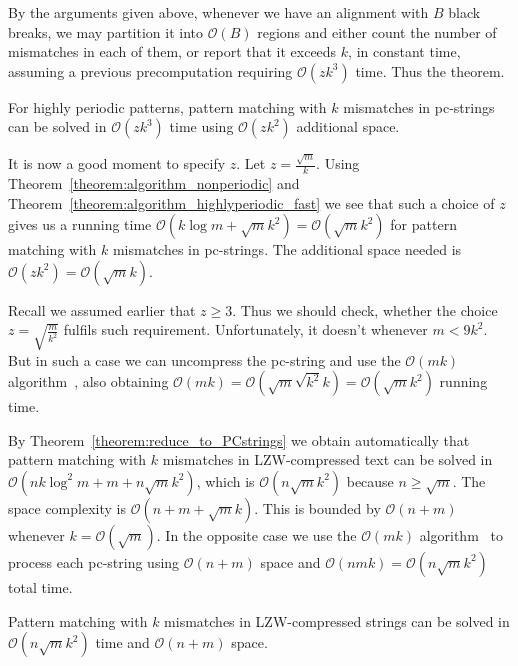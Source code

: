 \documentclass[runningheads]{llncs}
\begin{document}
By the arguments given above, whenever we have an alignment with $B$ black breaks, we may partition it into $\mathcal{O}(B)$ regions and either count the number of mismatches in each of them, or report that it exceeds $k$, in constant time, assuming a previous precomputation requiring $\mathcal{O}(zk^{3})$ time. Thus the theorem.

\begin{theorem}\label{theorem:algorithm_highlyperiodic_fast}
For highly periodic patterns, pattern matching with $k$ mismatches in pc-strings can be solved in $\mathcal{O}(zk^3)$ time using $\mathcal{O}(zk^2)$ additional space.
\end{theorem}

It is now a good moment to specify $z$. Let $z=\frac{\sqrt{m}}{k}$. Using Theorem~\ref{theorem:algorithm_nonperiodic} and Theorem~\ref{theorem:algorithm_highlyperiodic_fast} we see that such a choice of $z$ gives us a running time $\mathcal{O}(k\log m+\sqrt{m}k^{2})=\mathcal{O}(\sqrt{m}k^{2})$ for pattern matching with $k$ mismatches in pc-strings. The additional space needed is $\mathcal{O}(zk^2)=\mathcal{O}(\sqrt{m}k)$.

\begin{remark}
Recall we assumed earlier that $z\geq 3$. Thus we should check, whether the choice $z=\sqrt{\frac{m}{k^2}}$ fulfils such requirement. Unfortunately, it doesn't whenever $m<9k^2$. But in such a case we can uncompress the pc-string and use the $\mathcal{O}(mk)$ algorithm~\cite{LandauMismatches}, also obtaining $\mathcal{O}(mk)=\mathcal{O}(\sqrt{m}\sqrt{k^2}k)=\mathcal{O}(\sqrt{m}k^{2})$ running time.
\end{remark}

By Theorem~\ref{theorem:reduce_to_PCstrings} we obtain automatically that pattern matching with $k$ mismatches in LZW-compressed text can be solved in $\mathcal{O}(nk\log^{2}m+m+n\sqrt{m}k^{2})$, which is $\mathcal{O}(n\sqrt{m}k^{2})$ because $n\geq\sqrt{m}$. The space complexity is $\mathcal{O}(n+m+\sqrt{m}k)$. This is bounded by $\mathcal{O}(n+m)$ whenever $k=\mathcal{O}(\sqrt{m})$. In the opposite case we use the $\mathcal{O}(mk)$ algorithm~\cite{LandauMismatches} to process each pc-string using
$\mathcal{O}(n+m)$ space and $\mathcal{O}(nmk)=\mathcal{O}(n\sqrt{m}k^2)$ total time.

\begin{theorem}
Pattern matching with $k$ mismatches in LZW-compressed strings can be solved in $\mathcal{O}(n\sqrt{m}k^{2})$ time and $\mathcal{O}(n+m)$ space.
\end{theorem}
\end{document}
